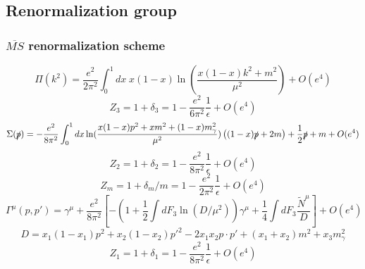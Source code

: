 \subsection{Renormalization group}
\subsubsection{$\overline{MS}$ renormalization scheme}
\[\Pi(k^2) = \frac{e^2}{2\pi^2} \int_0^1 dx \; x(1-x) \ln(\frac{x(1-x)k^2+m^2}{\mu^2}) + O(e^4)\]
\[Z_3 = 1 + \delta_3 = 1-\frac{e^2}{6\pi^2} \frac{1}{\epsilon} + O(e^4)\]
\[\Sigma(\slashed{p}) = -\frac{e^2}{8\pi^2} \int_0^1 dx  \ln(\frac{x(1-x)p^2 + xm^2 + (1-x)m_{\gamma}^2}{\mu^2}) \left((1-x)\slashed{p}+2m\right) + \frac{1}{2}\slashed{p} + m + O(e^4) \]
\[Z_2 = 1 + \delta_2 =  1 - \frac{e^2}{8\pi^2}  \frac{1}{\epsilon} + O(e^4)\]
\[Z_m = 1 + \delta_m/m = 1 - \frac{e^2}{2\pi^2} \frac{1}{\epsilon} + O(e^4) \]
\[\Gamma^{\mu}(p,p') = \gamma^{\mu} + \frac{e^2}{8\pi^2} \left[-\left(  1 + \frac{1}{2} \int dF_3 \ln (D/\mu^2)\right)\gamma^{\mu} + \frac{1}{4} \int dF_3 \frac{\tilde{N}^{\mu}}{D}\right] + O(e^4)\]
\[D = x_1(1-x_1)p^2 + x_2(1-x_2)p'^2 - 2x_1x_2p \cdot p' + (x_1+x_2)m^2 + x_3 m_{\gamma}^2\]
\[Z_1 =1 + \delta_1 = 1 -  \frac{e^2}{8\pi^2}\frac{1}{\epsilon} + O(e^4)\]
